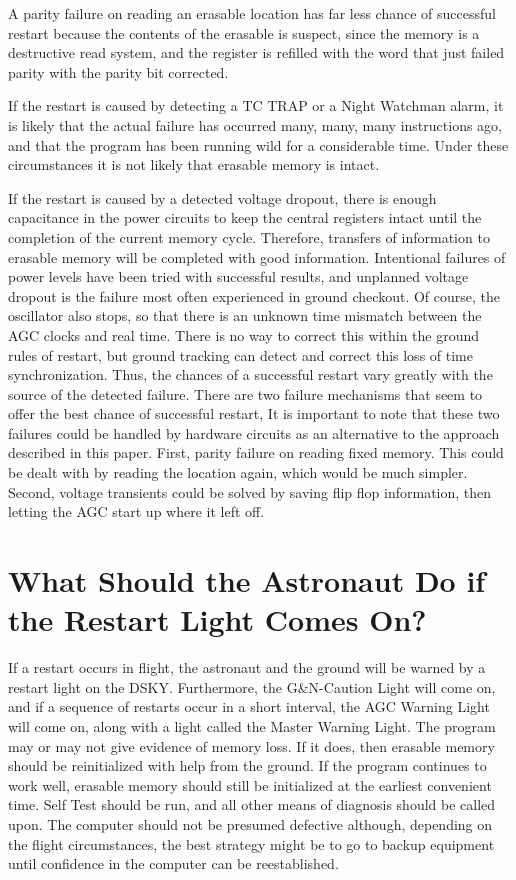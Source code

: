 \documentclass[oxford]{ahsan}
\begin{document}
A parity failure on reading an erasable location has far less chance of successful
restart because the contents of the erasable is suspect, since the memory is a
destructive read system, and the register is refilled with the word that just failed
parity with the parity bit corrected.

If the restart is caused by detecting a TC TRAP or a Night Watchman alarm, it is likely
that the actual failure has occurred many, many, many instructions ago, and that the
program has been running wild for a considerable time. Under these circumstances it is
not likely that erasable memory is intact.

If the restart is caused by a detected voltage dropout, there is enough capacitance in
the power circuits to keep the central registers intact until the completion of the
current memory cycle. Therefore, transfers of information to erasable memory will be
completed with good information. Intentional failures of power levels have been tried
with successful results, and unplanned voltage dropout is the failure most often
experienced in ground checkout. Of course, the oscillator also stops, so that there is
an unknown time mismatch between the AGC clocks and real time. There is no way to
correct this within the ground rules of restart, but ground tracking can detect and
correct this loss of time synchronization. Thus, the chances of a successful restart
vary greatly with the source of the detected failure. There are two failure mechanisms
that seem to offer the best chance of successful restart, It is important to note that
these two failures could be handled by hardware circuits as an alternative to the
approach described in this paper. First, parity failure on reading fixed memory. This
could be dealt with by reading the location again, which would be much simpler. Second,
voltage transients could be solved by saving flip flop information, then letting the
AGC start up where it left off.

\section{What  Should the Astronaut Do if the Restart Light Comes On?}

If a restart occurs in flight, the astronaut and the ground will be warned by a restart
light on the DSKY. Furthermore, the G\&N-Caution Light will come on, and if a sequence
of restarts occur in a short interval, the AGC Warning Light will come on, along with a
light called the Master Warning Light. The program may or may not give evidence of
memory loss. If it does, then erasable memory should be reinitialized with help from the
ground. If the program continues to work well, erasable memory should still be
initialized at the earliest convenient time. Self Test should be run, and all other
means of diagnosis should be called upon. The computer should not be presumed defective
although, depending on the flight circumstances, the best strategy might be to go to
backup equipment until confidence in the computer can be reestablished.
\end{document}

